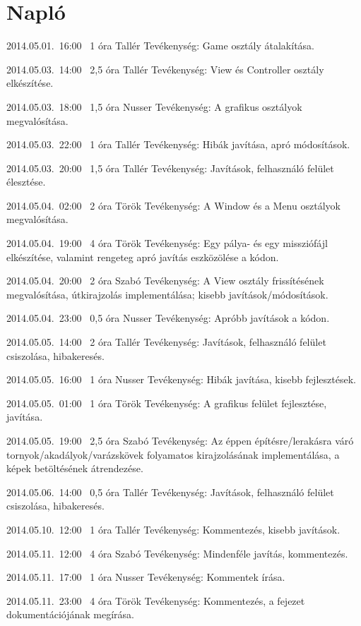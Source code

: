 %
\section{Napló}

\begin{naplo}

\bejegyzes
{2014.05.01.~16:00~}
{1 óra}
{Tallér}
{Tevékenység: Game osztály átalakítása.}

\bejegyzes
{2014.05.03.~14:00~}
{2,5 óra}
{Tallér}
{Tevékenység: View és Controller osztály elkészítése.}

\bejegyzes
{2014.05.03.~18:00~}
{1,5 óra}
{Nusser}
{Tevékenység: A grafikus osztályok megvalósítása.}

\bejegyzes
{2014.05.03.~22:00~}
{1 óra}
{Tallér}
{Tevékenység: Hibák javítása, apró módosítások.}

\bejegyzes
{2014.05.03.~20:00~}
{1,5 óra}
{Tallér}
{Tevékenység: Javítások, felhasználó felület élesztése.}

\bejegyzes
{2014.05.04.~02:00~}
{2 óra}
{Török}
{Tevékenység: A Window és a Menu osztályok megvalósítása.}

\bejegyzes
{2014.05.04.~19:00~}
{4 óra}
{Török}
{Tevékenység: Egy pálya- és egy missziófájl elkészítése, valamint rengeteg apró javítás eszközölése a kódon.}

\bejegyzes
{2014.05.04.~20:00~}
{2 óra}
{Szabó}
{Tevékenység: A View osztály frissítésének megvalósítása, útkirajzolás implementálása; kisebb javítások/módosítások.}

\bejegyzes
{2014.05.04.~23:00~}
{0,5 óra}
{Nusser}
{Tevékenység: Apróbb javítások a kódon.}

\bejegyzes
{2014.05.05.~14:00~}
{2 óra}
{Tallér}
{Tevékenység: Javítások, felhasználó felület csiszolása, hibakeresés.}

\bejegyzes
{2014.05.05.~16:00~}
{1 óra}
{Nusser}
{Tevékenység: Hibák javítása, kisebb fejlesztések.}

\bejegyzes
{2014.05.05.~01:00~}
{1 óra}
{Török}
{Tevékenység: A grafikus felület fejlesztése, javítása.}


\bejegyzes
{2014.05.05.~19:00~}
{2,5 óra}
{Szabó}
{Tevékenység: Az éppen építésre/lerakásra váró tornyok/akadályok/varázskövek folyamatos kirajzolásának implementálása, a képek betöltésének átrendezése.}

\bejegyzes
{2014.05.06.~14:00~}
{0,5 óra}
{Tallér}
{Tevékenység: Javítások, felhasználó felület csiszolása, hibakeresés.}

\bejegyzes
{2014.05.10.~12:00~}
{1 óra}
{Tallér}
{Tevékenység: Kommentezés, kisebb javítások.}

\bejegyzes
{2014.05.11.~12:00~}
{4 óra}
{Szabó}
{Tevékenység: Mindenféle javítás, kommentezés.}

\bejegyzes
{2014.05.11.~17:00~}
{1 óra}
{Nusser}
{Tevékenység: Kommentek írása.}

\bejegyzes
{2014.05.11.~23:00~}
{4 óra}
{Török}
{Tevékenység: Kommentezés, a fejezet dokumentációjának megírása.}


\end{naplo}

